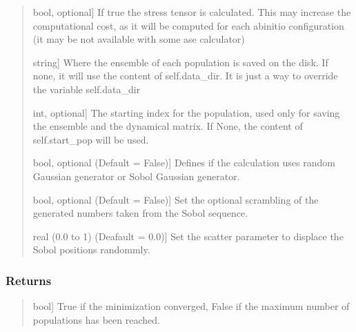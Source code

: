 \documentclass[a4paper,11pt,english]{sphinxmanual}
\begin{document}
\begin{fulllineitems}
\begin{fulllineitems}
\begin{quote}
\begin{description}
\sphinxlineitem{get\_stress}{[}bool, optional{]}
\sphinxAtStartPar
If true the stress tensor is calculated. This may increase the computational
cost, as it will be computed for each ab\sphinxhyphen{}initio configuration (it may be not available
with some ase calculator)

\sphinxlineitem{ensemble\_loc}{[}string{]}
\sphinxAtStartPar
Where the ensemble of each population is saved on the disk. If none, it will
use the content of self.data\_dir. It is just a way to override the variable self.data\_dir

\sphinxlineitem{start\_pop}{[}int, optional{]}
\sphinxAtStartPar
The starting index for the population, used only for saving the ensemble and the dynamical
matrix. If None, the content of self.start\_pop will be used.

\sphinxlineitem{sobol}{[}bool, optional (Default = False){]}
\sphinxAtStartPar
Defines if the calculation uses random Gaussian generator or Sobol Gaussian generator.

\sphinxlineitem{sobol\_scramble}{[}bool, optional (Default = False){]}
\sphinxAtStartPar
Set the optional scrambling of the generated numbers taken from the Sobol sequence.

\sphinxlineitem{sobol\_scatter}{[}real (0.0 to 1) (Deafault = 0.0){]}
\sphinxAtStartPar
Set the scatter parameter to displace the Sobol positions randommly.

\end{description}
\end{quote}


\subsubsection{Returns}
\label{\detokenize{apireference:id40}}\begin{quote}
\begin{description}
\sphinxlineitem{status}{[}bool{]}
\sphinxAtStartPar
True if the minimization converged, False if the maximum number of
populations has been reached.

\end{description}
\end{quote}

\end{fulllineitems}



\end{fulllineitems}
\end{document}
